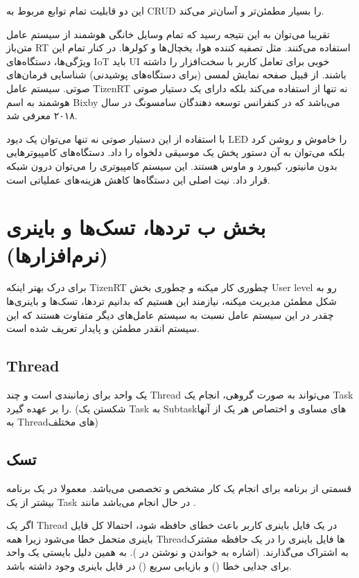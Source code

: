 \documentclass[10pt, a4paper]{article}
\begin{document}
این دو قابلیت تمام توابع مربوط به CRUD را بسیار مطمئن‌تر و آسان‌تر می‌کند.

تقریبا می‌توان به این نتیجه رسید که تمام وسایل خانگی هوشمند از سیستم عامل
متن‌باز RT استفاده می‌کنند. مثل تصفیه کننده هوا، یخچال‌ها و کولر‌ها. در کنار
تمام این ویژگی‌ها، دستگاه‌های IoT باید UI خوبی برای تعامل کاربر با سخت‌افزار را
داشته باشند. از قبیل صفحه نمایش لمسی (برای دستگاه‌های پوشیدنی) شناسایی فرمان‌های
صوتی. سیستم عامل TizenRT نه تنها از  استفاده می‌کند
بلکه دارای یک دستیار صوتی هوشمند به اسم Bixby می‌باشد که در کنفرانس توسعه
دهندگان سامسونگ در سال ۲۰۱۸ \cite{samsungbixby} معرفی شد.

با استفاده از این دستیار صوتی نه تنها می‌توان یک دیود LED را خاموش و روشن کرد
بلکه می‌توان به آن دستور پخش یک موسیقی دلخواه را داد. دستگاه‌های  کامپیوتر‌هایی بدون مانیتور، کیبورد و ماوس‌ هستند.  این سیستم کامپیوتری
را می‌توان درون شبکه قرار داد. نیت اصلی این دستگاه‌ها کاهش هزینه‌های عملیاتی
است.

\section{بخش ب ترد‌ها، تسک‌ها و باینری (نرم‌افزار‌ها)}

برای درک بهتر اینکه TizenRT چطوری کار میکنه و چطوری بخش User level رو به شکل
مطمئن مدیریت میکنه، نیازمند این هستیم که بدانیم تردها، تسک‌ها و باینری‌ها چقدر
در این سیستم عامل نسبت به سیستم عامل‌های دیگر متفاوت هستند که این سیستم انقدر
مطمئن و پایدار تعریف شده است.

\subsection{Thread}

یک واحد برای زمانبندی است و چند Thread می‌تواند به صورت گروهی، انجام یک Task را
بر عهده گیرد. (شکستن یک Task به Subtask‌های مساوی و اختصاص هر یک از آنها به
Threadهای مختلف)

\subsection{تسک}

قسمتی از برنامه برای انجام یک کار مشخص و تخصصی می‌باشد. معمولا در یک برنامه
بیشتر از یک Task در حال انجام می‌باشد \cite{tizenrtrepo} مانند .

اگر یک Thread در یک فایل باینری کاربر باعث خطای حافظه شود، احتمالا کل فایل‌
باینری متحمل خطا می‌شود زیرا همه Threadها فایل باینری را در یک حافظه مشترک به
اشتراک می‌گذارند. (اشاره به خواندن و نوشتن در ). به همین دلیل
بایستی یک واحد برای جدایی خطا () و بازیابی سریع () در فایل باینری وجود داشته باشد.
\end{document}
